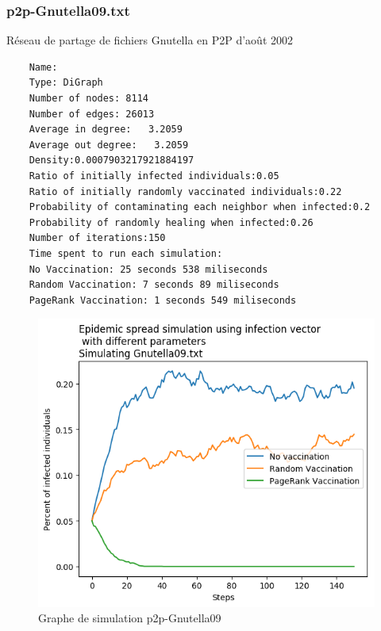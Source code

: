 \documentclass{report}
\begin{document}
\subsubsection{p2p-Gnutella09.txt}
Réseau de partage de fichiers Gnutella en P2P d'août 2002
\begin{tcolorbox}
  \begin{verbatim}
    Name:
    Type: DiGraph
    Number of nodes: 8114
    Number of edges: 26013
    Average in degree:   3.2059
    Average out degree:   3.2059
    Density:0.0007903217921884197
    Ratio of initially infected individuals:0.05
    Ratio of initially randomly vaccinated individuals:0.22
    Probability of contaminating each neighbor when infected:0.2
    Probability of randomly healing when infected:0.26
    Number of iterations:150
    Time spent to run each simulation:
    No Vaccination: 25 seconds 538 miliseconds
    Random Vaccination: 7 seconds 89 miliseconds
    PageRank Vaccination: 1 seconds 549 miliseconds
  \end{verbatim}
\end{tcolorbox}
\begin{figure}[ht!]
  \centering
  \includegraphics[scale=0.7]{../plots/Gnutella09.png}
  \caption{Graphe de simulation p2p-Gnutella09}
\end{figure}
\newpage
\end{document}
